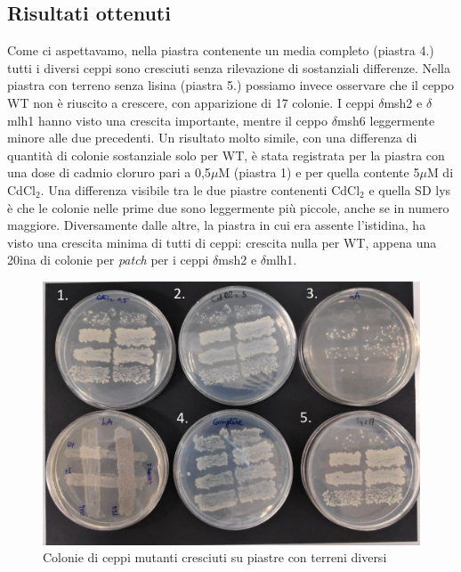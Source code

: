  \subsection{Risultati ottenuti}
	Come ci aspettavamo, nella piastra contenente un media completo (piastra 4.) tutti i diversi ceppi sono cresciuti senza rilevazione di sostanziali differenze. Nella piastra con terreno senza lisina (piastra 5.) possiamo invece osservare che il ceppo WT non è riuscito a crescere, con apparizione di 17 colonie. I ceppi $\delta$msh2 e $\delta$mlh1 hanno visto una crescita importante, mentre il ceppo $\delta$msh6 leggermente minore alle due precedenti. Un risultato molto simile, con una differenza di quantità di colonie sostanziale solo per WT, è stata registrata per la piastra con una dose di cadmio cloruro pari a 0,5$\mu$M (piastra 1) e per quella contente 5$\mu$M di CdCl$_{2}$. Una differenza visibile tra le due piastre contenenti CdCl$_{2}$ e quella SD lys è che le colonie nelle prime due sono leggermente più piccole, anche se in numero maggiore. Diversamente dalle altre, la piastra in cui era assente l'istidina, ha visto una crescita minima di tutti di ceppi: crescita nulla per WT, appena una 20ina di colonie per \textit{patch} per i ceppi $\delta$msh2 e $\delta$mlh1. 
	
 \begin{figure}[H]
	\centering
    \includegraphics[scale=0.4]{./Pics/geneambientemod1.jpg}
	\caption{Colonie di ceppi mutanti cresciuti su piastre con terreni diversi}
	\label{fig1}
	\end{figure}
 
 

